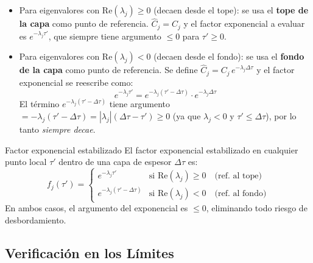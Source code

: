 \documentclass[a4paper,11pt]{article}
\begin{document}
\begin{itemize}
    \item Para eigenvalores con $\text{Re}(\lambda_j) \geq 0$ (decaen desde el
          tope): se usa el \textbf{tope de la capa} como punto de referencia.
          $\hat{C}_j = C_j$ y el factor exponencial a evaluar es
          $e^{-\lambda_j\tau'}$, que siempre tiene argumento $\leq 0$ para
          $\tau' \geq 0$.

    \item Para eigenvalores con $\text{Re}(\lambda_j) < 0$ (decaen desde el fondo):
          se usa el \textbf{fondo de la capa} como punto de referencia.
          Se define $\hat{C}_j = C_j\,e^{-\lambda_j\Delta\tau}$ y el factor
          exponencial se reescribe como:
          \begin{equation}
              e^{-\lambda_j\tau'} = e^{-\lambda_j(\tau'-\Delta\tau)}
              \cdot e^{-\lambda_j\Delta\tau}
          \end{equation}
          El t\'ermino $e^{-\lambda_j(\tau'-\Delta\tau)}$ tiene argumento
          $= -\lambda_j(\tau'-\Delta\tau) = |\lambda_j|(\Delta\tau - \tau') \geq 0$
          (ya que $\lambda_j < 0$ y $\tau' \leq \Delta\tau$), por lo tanto
          \emph{siempre decae}.
\end{itemize}

\begin{keyresult}{Factor exponencial estabilizado}
El factor exponencial estabilizado en cualquier punto local $\tau'$ dentro de
una capa de espesor $\Delta\tau$ es:
\begin{equation}\label{eq:stable_exp}
    \boxed{f_j(\tau') = \begin{cases}
        e^{-\lambda_j\tau'} & \text{si } \text{Re}(\lambda_j) \geq 0
        \quad\text{(ref.\ al tope)}\\[4pt]
        e^{-\lambda_j(\tau'-\Delta\tau)} & \text{si } \text{Re}(\lambda_j) < 0
        \quad\text{(ref.\ al fondo)}
    \end{cases}}
\end{equation}
En ambos casos, el argumento del exponencial es $\leq 0$, eliminando todo
riesgo de desbordamiento.
\end{keyresult}

\subsection{Verificaci\'on en los L\'imites}
\end{document}
